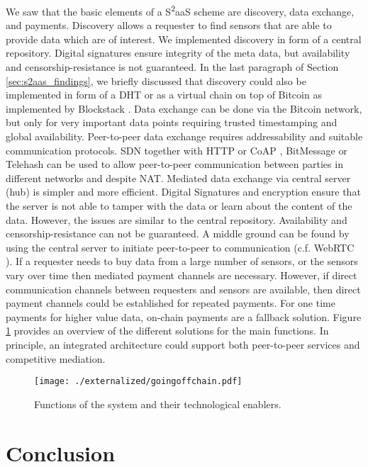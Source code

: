 We saw that the basic elements of a S\textsuperscript{2}aaS scheme are discovery, data exchange, and payments. Discovery allows a requester to find sensors that are able to provide data which are of interest. We implemented discovery in form of a central repository. Digital signatures ensure integrity of the meta data, but availability and censorship-resistance is not guaranteed. In the last paragraph of Section \ref{sec:s2aas_findings}, we briefly discussed that discovery could also be implemented in form of a \ac{DHT} or as a virtual chain on top of Bitcoin as implemented by Blockstack \parencite{ali2016blockstack}. Data exchange can be done via the Bitcoin network, but only for very important data points requiring trusted timestamping and global availability. Peer-to-peer data exchange requires addressability and suitable communication protocols. \ac{SDN} together with \ac{HTTP} or \ac{CoAP} \parencite{shelby2014constrained}, BitMessage \parencite{warren2012bitmessage} or Telehash can be used to allow peer-to-peer communication between parties in different networks and despite \ac{NAT}. Mediated data exchange via central server (hub) is simpler and more efficient. Digital Signatures and encryption ensure that the server is not able to tamper with the data or learn about the content of the data. However, the issues are similar to the central repository. Availability and censorship-resistance can not be guaranteed. A middle ground can be found by using the central server to initiate peer-to-peer to communication (c.f. WebRTC \parencite{bergkvist2012narayanan}). If a requester needs to buy data from a large number of sensors, or the sensors vary over time then mediated payment channels are necessary. However, if direct communication channels between requesters and sensors are available, then direct payment channels could be established for repeated payments. For one time payments for higher value data, on-chain payments are a fallback solution. Figure \ref{fig:conceptual_overview} provides an overview of the different solutions for the main functions. In principle, an integrated architecture could support both peer-to-peer services and competitive mediation. 

\begin{figure}
 \centering
 \texttt{[image: ./externalized/goingoffchain.pdf]}
 \caption{Functions of the system and their technological enablers.}
 \label{fig:conceptual_overview}
 \end{figure}


\section{Conclusion}
\label{sec:trustlessconclusion}

